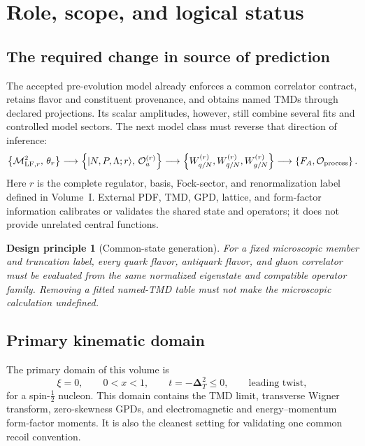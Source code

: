 \documentclass[11pt]{article}
\newtheorem{principle}[definition]{Design principle}
\newcommand{\DT}{\bm{\Delta}_{T}}
\newcommand{\LF}{\mathrm{LF}}
\newcommand{\cO}{\mathcal O}
\newcommand{\cM}{\mathcal M}
\begin{document}
\tableofcontents

\section{Role, scope, and logical status}
\label{sec:scope}

\subsection{The required change in source of prediction}

The accepted pre-evolution model already enforces a common correlator
contract, retains flavor and constituent provenance, and obtains named TMDs
through declared projections.  Its scalar amplitudes, however, still combine
several fits and controlled model sectors.  The next model class must reverse
that direction of inference:
\begin{equation}
 \left\{\cM_{\LF,r}^2,\,\theta_r\right\}
 \longrightarrow
 \left\{|N,P,\Lambda;r\rangle,\,\cO_{a}^{(r)}\right\}
 \longrightarrow
 \left\{W_{q/N}^{(r)},W_{\bar q/N}^{(r)},W_{g/N}^{(r)}\right\}
 \longrightarrow
 \left\{F_A,\cO_{\rm process}\right\}.
\label{eq:source-reversal}
\end{equation}
Here \(r\) is the complete regulator, basis, Fock-sector, and
renormalization label defined in Volume~I.  External PDF, TMD, GPD, lattice,
and form-factor information calibrates or validates the shared state and
operators; it does not provide unrelated central functions.

\begin{principle}[Common-state generation]
\label{prin:common-state}
For a fixed microscopic member and truncation label, every quark flavor,
antiquark flavor, and gluon correlator must be evaluated from the same
normalized eigenstate and compatible operator family.  Removing a fitted
named-TMD table must not make the microscopic calculation undefined.
\end{principle}

\subsection{Primary kinematic domain}

The primary domain of this volume is
\begin{equation}
 \xi=0,
 \qquad
 0<x<1,
 \qquad
 t=-\DT^2\le0,
 \qquad
 \text{leading twist},
\label{eq:primary-domain}
\end{equation}
for a spin-\(\tfrac12\) nucleon.  This domain contains the TMD limit,
transverse Wigner transform, zero-skewness GPDs, and electromagnetic and
energy--momentum form-factor moments.  It is also the cleanest setting for
validating one common recoil convention.
\end{document}
